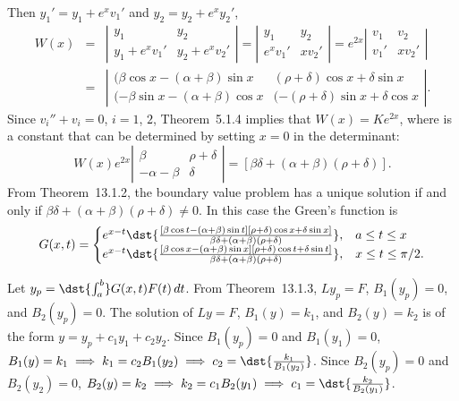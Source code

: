 \documentclass[dvips]{book}
\renewcommand{\exer}[1]{\par\medskip\;\noindent{\color{red}\bf #1.}}
\numberwithin{example}{section}
\numberwithin{equation}{section}
\numberwithin{theorem}{section}
\numberwithin{table}{section}
\numberwithin{figure}{section}
\begin{document}
Then $y_{1}'=y_{1}+e^{x}v_{1}'$
and $y_{2}=y_{2}+e^{x}y_{2}'$,
\begin{eqnarray*}
W(x)&=&
\left|\begin{array}{cccccc}
y_{1}&y_{2}\\ y_{1}+e^{x}v_{1}'&y_{2}+e^{x}v_{2}'
\end{array}\right|=
\left|\begin{array}{cccccc}
y_{1}&y_{2}\\ e^{x}v_{1}'&{x}v_{2}'
\end{array}\right|= e^{2x}
\left|\begin{array}{cccccc}
v_{1}&v_{2}\\ v_{1}'&{x}v_{2}'
\end{array}\right|  \\
&=&
\left|\begin{array}{rrcccc}
(\beta\cos x-(\alpha+\beta)\sin x&
(\rho+\delta)\cos x+\delta\sin x \\
(-\beta\sin x-(\alpha+\beta)\cos x&
(-(\rho+\delta)\sin x+\delta\cos x
\end{array}\right|.
\end{eqnarray*}
Since $v_{i}''+v_{i}=0$, $i=1$, $2$,
Theorem~5.1.4 implies that $W(x)=Ke^{2x}$, where
is a constant that can be determined by setting $x=0$ in the determinant:
$$
W(x)e^{2x}
\left|\begin{array}{cccccc}
\beta&\rho+\delta\\-\alpha-\beta&\delta
\end{array}\right|
=[\beta\delta+(\alpha+\beta)(\rho+\delta)].
$$
From Theorem~13.1.2, the boundary value problem has a unique
solution if and only if $\beta\delta+(\alpha+\beta)(\rho+\delta)\ne0$.
In this case the Green's function is
$$
G(x,t)=
\begin{cases}
e^{x-t}\dst{\frac{[\beta\cos t-(\alpha+\beta)\sin t]
[\rho+\delta)\cos x+\delta\sin x]}
{\beta\delta+(\alpha+\beta)(\rho+\delta)}},&a\le t\le x \\
e^{x-t}\dst{\frac{[\beta\cos x-(\alpha+\beta)\sin x]
[\rho+\delta)\cos t+\delta\sin t]}
{\beta\delta+(\alpha+\beta)(\rho+\delta)}},&x\le t \le \pi/2.
\end{cases}
$$


\exer{13.1.32} Let $y_{p}=\dst{\int_{a}^{b}}G(x,t)F(t)\,dt$. From
Theorem~13.1.3, $Ly_{p}=F$, $B_{1}(y_{p})=0$, and $B_{2}(y_{p})=0$.
The solution of $Ly=F$, $B_{1}(y)=k_{1}$, and $B_{2}(y)=k_{2}$
is of the form $y=y_{p}+c_{1}y_{1}+c_{2}y_{2}$. Since
$B_{1}(y_{p})=0$ and $B_{1}(y_{1})=0$,
$B_{1}(y)=k_{1}\implies k_{1}=c_{2}B_{1}(y_{2})\implies
c_{2}=\dst{\frac{k_{1}}{B_{1}(y_{2})}}$.
Since $B_{2}(y_{p})=0$ and $B_{2}(y_{2})=0$,
$B_{2}(y)=k_{2}\implies k_{2}=c_{1}B_{2}(y_{1})\implies
c_{1}=\dst{\frac{k_{2}}{B_{2}(y_{1})}}$.
\end{document}
